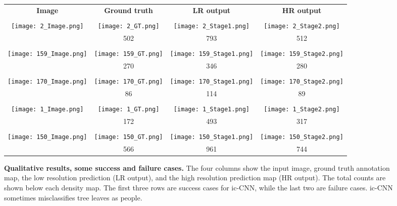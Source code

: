\documentclass[runningheads]{llncs}
\begin{document}
\begin{figure}
\begin{tabular}{cccc}
{\bf Image} & {\bf Ground truth} & {\bf LR output} & {\bf HR  output} \\ \\ 
{  
	\texttt{[image: 2\_Image.png]}
     } &  {  
	\texttt{[image: 2\_GT.png]}
     }
     &
     {\texttt{[image: 2\_Stage1.png]}
     } & 
     {\texttt{[image: 2\_Stage2.png]}
     } \\
    &502  & 793 & 512\\
   \\ 
{  
	\texttt{[image: 159\_Image.png]}
     } &  {  
	\texttt{[image: 159\_GT.png]}
     }
     &
     {\texttt{[image: 159\_Stage1.png]}
     } & 
     {\texttt{[image: 159\_Stage2.png]}
     } \\
    &270  & 346 & 280\\
   \\ 
{  
	\texttt{[image: 170\_Image.png]}
     } &  {  
	\texttt{[image: 170\_GT.png]}
     }
     &
     {\texttt{[image: 170\_Stage1.png]}
     } & 
     {\texttt{[image: 170\_Stage2.png]}
     } \\
    &86  & 114 & 89\\
   \\ 
{  
	\texttt{[image: 1\_Image.png]}
     } &  {  
	\texttt{[image: 1\_GT.png]}
     }
     &
     {\texttt{[image: 1\_Stage1.png]}
     } & 
     {\texttt{[image: 1\_Stage2.png]}
     } \\
    &172  & 493 & 317\\
   \\ 
   {  
	\texttt{[image: 150\_Image.png]}
     } &  {  
	\texttt{[image: 150\_GT.png]}
     }
     &
     {\texttt{[image: 150\_Stage1.png]}
     } & 
     {\texttt{[image: 150\_Stage2.png]}
     } \\
    &566  & 961 & 744\\
\end{tabular}
\caption{{\bf Qualitative results, some success and failure cases.} The four columns show the input image, ground truth annotation map, the low resolution prediction (LR output), and the high resolution prediction map (HR output). The total counts are shown below each density map. The first three rows are success cases for ic-CNN, while the last two are failure cases. ic-CNN sometimes misclassifies tree leaves as people.\label{quali}}
\end{figure}
\end{document}
